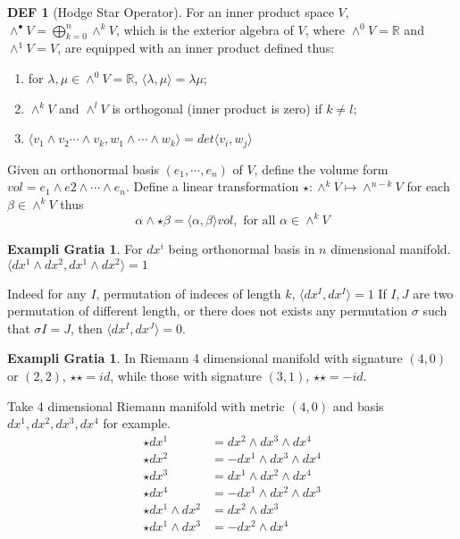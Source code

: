 \documentclass[twocolumn]{article}
\newcommand{\R}{\mathbb{R}}
\theoremstyle{definition}
\newtheorem{example}[thm]{Exampli Gratia}
\newtheorem{defi}[thm]{DEF}
\begin{document}
\begin{defi}[Hodge Star Operator]
	For an inner product space $V$, $\wedge^{\bullet}V = \bigoplus^n_{k=0} \wedge^k V$, which is the exterior algebra of $V$, where $\wedge^0 V = \R$ and $\wedge^1 V = V$, are equipped with an inner product defined thus:
	\begin{enumerate}
		\item for $\lambda, \mu \in \wedge^0 V = \R$, $\langle \lambda, \mu \rangle = \lambda \mu$;
		\item $\wedge^k V$ and $\wedge^l V$ is orthogonal (inner product is zero) if $k \neq l$;
		\item $\langle v_1 \wedge v_2 \cdots \wedge v_k, w_1 \wedge \cdots \wedge w_k \rangle = det\langle v_i, w_j \rangle$
	\end{enumerate}
	Given an orthonormal basis $(e_1, \cdots, e_n)$ of $V$, define the volume form $vol = e_1\wedge e2 \wedge \cdots \wedge e_n$. 
	Define a linear transformation $\star: \wedge^k V \mapsto \wedge^{n-k}V$ for each $\beta \in \wedge^{k} V$ thus
	$$
	\alpha \wedge \star \beta = \langle \alpha, \beta \rangle vol, \text{ for all } \alpha \in \wedge^{k} V
	$$
\end{defi}

\begin{example}
	For $dx^i$ being orthonormal basis in $n$ dimensional manifold.
	$\langle dx^1 \wedge dx^2, dx^1 \wedge dx^2 \rangle = 1$

	Indeed for any $I$, permutation of indeces of length $k$,
	$\langle dx^I , dx^I \rangle = 1$
	If $I,J$ are two permutation of different length, or there does not exists any permutation $\sigma$ such that $\sigma I = J$, then $\langle dx^I, dx^J \rangle = 0$.
\end{example}
\begin{example}
In Riemann 4 dimensional manifold with signature $(4, 0)$ or $(2,2)$, $\star \star = id$, while those with signature $(3,1)$, $\star \star = - id$.

Take 4 dimensional Riemann manifold with metric $(4,0)$ and basis $dx^1, dx^2, dx^3, dx^4$ for example.
\begin{align*}
	\star dx^1 &= dx^2 \wedge dx^3 \wedge dx^4 \\
	\star dx^2 &= - dx^1 \wedge dx^3 \wedge dx^4 \\
	\star dx^3 &=  dx^1 \wedge dx^2 \wedge dx^4 \\
	\star dx^4 &= - dx^1 \wedge dx^2 \wedge dx^3 \\
	\star dx^1 \wedge dx^2 &=  dx^2 \wedge dx^3 \\
	\star dx^1 \wedge dx^3 &=  - dx^2 \wedge dx^4 \\
\end{align*}

\end{example}
\end{document}
